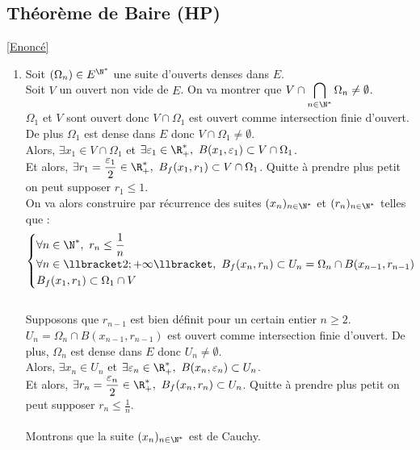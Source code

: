 \documentclass{book}
\begin{document}
	\subsection{Théorème de Baire  (HP)}
	\label{sec:theoreme-de-baire-etoile5}
	\textcolor{blue}{\hyperref[Théorème de Baire]{[Enoncé]}}\\
	\begin{enumerate}[leftmargin=*]
		\item Soit $(\Omega_n)\in E^{\N^*}$ une suite d'ouverts denses dans $E$.\\
		Soit $V$ un ouvert non vide de $E$. On va montrer que $V\cap\displaystyle\bigcap\limits_{n\in \N^*}\Omega_n\ne \emptyset$.\\
		$\Omega_1$ et $V$ sont ouvert donc $V\cap \Omega_1$ est ouvert comme intersection finie d'ouvert. De plus $\Omega_1$ est dense dans $E$ donc $V\cap \Omega_1\ne\emptyset$.\\
		Alors, $\exists x_1\in V\cap \Omega_1$ et $\exists \varepsilon_1\in \R^*_+,\ B(x_1,\varepsilon_1)\subset V\cap \Omega_1$.\\
		Et alors, $\exists r_1=\displaystyle\frac{\varepsilon_1}{2}\in \R^*_+,\ B_f(x_1,r_1)\subset V\cap \Omega_1$. Quitte à prendre plus petit on peut supposer $r_1\leq 1$.\\
		On va alors construire par récurrence des suites $(x_n)_{n\in \N^*}$ et $(r_n)_{n\in \N^*}$ telles que :
		$$\begin{cases}
			\forall n\in \N^*,\ r_n\leq \displaystyle\frac{1}{n}\\
			\forall n\in \llbracket 2;+\infty\llbracket,\ B_f(x_n,r_n)\subset U_n=\Omega_n\cap B(x_{n-1},r_{n-1})\\
			B_f(x_1,r_1)\subset\Omega_1\cap V
		\end{cases}$$\\
		Supposons que $r_{n-1}$ est bien définit pour un certain entier $n\geq 2$.\\
		$U_n=\Omega_n\cap B(x_{n-1},r_{n-1})$ est ouvert comme intersection finie d'ouvert. De plus, $\Omega_n$ est dense dans $E$ donc $U_n\ne \emptyset$.\\
		Alors, $\exists x_n\in U_n$ et $\exists \varepsilon_n\in \R^*_+,\ B(x_n,\varepsilon_n)\subset U_n$.\\
		Et alors, $\exists r_n=\displaystyle\frac{\varepsilon_n}{2}\in \R^*_+,\ B_f(x_n,r_n)\subset U_n$. Quitte à prendre plus petit on peut supposer $r_n\leq \displaystyle\frac{1}{n}$.\\\\
		Montrons que la suite $(x_n)_{n\in \N^*}$ est de Cauchy.\\

\end{enumerate}
\end{document}
